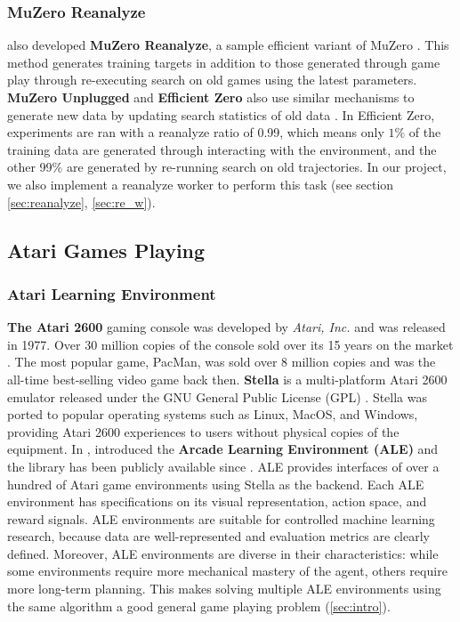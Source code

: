 \subsubsection{MuZero Reanalyze} \label{sec:muzero_reanalyze}
\citeauthor{MasteringAtariGo_Schrittwieser.Antonoglou.ea_2020} also developed \textbf{MuZero Reanalyze}, a sample efficient variant of MuZero \cite{MasteringAtariGo_Schrittwieser.Antonoglou.ea_2020}.
This method generates training targets in addition to those generated through game play through re-executing search on old games using the latest parameters.
\textbf{MuZero Unplugged} and \textbf{Efficient Zero} also use similar mechanisms to generate new data by updating search statistics of old data \cite{OnlineOfflineReinforcement_Schrittwieser.Hubert.ea_2021b,MasteringAtariGames_Ye.Liu.ea_2021}.
In Efficient Zero, experiments are ran with a reanalyze ratio of 0.99, which means only $1\%$ of the training data are generated through interacting with the environment, and the other 99\% are generated by re-running search on old trajectories.
In our project, we also implement a reanalyze worker to perform this task (see section \ref{sec:reanalyze}, \ref{sec:re_w}).

\subsection{Atari Games Playing}
\subsubsection{Atari Learning Environment} \label{sec:ale}
\textbf{The Atari 2600} gaming console was developed by \textit{Atari, Inc.} and was released in 1977.
Over 30 million copies of the console sold over its 15 years on the market \cite{Atari2600__2022}.
The most popular game, PacMan, was sold over 8 million copies and was the all-time best-selling video game back then.
\textbf{Stella} is a multi-platform Atari 2600 emulator released under the GNU General Public License (GPL) \cite{StellaMultiPlatformAtari__}.
Stella was ported to popular operating systems such as Linux, MacOS, and Windows, providing Atari 2600 experiences to users without physical copies of the equipment.
In \citeyear{ArcadeLearningEnvironment_Bellemare.Naddaf.ea_2013a}, \citeauthor{ArcadeLearningEnvironment_Bellemare.Naddaf.ea_2013a} introduced the \textbf{Arcade Learning Environment (ALE)} and the library has been publicly available since \cite{ArcadeLearningEnvironment_Bellemare.Naddaf.ea_2013a}.
ALE provides interfaces of over a hundred of Atari game environments using Stella as the backend.
Each ALE environment has specifications on its visual representation, action space, and reward signals.
ALE environments are suitable for controlled machine learning research,
because data are well-represented and evaluation metrics are clearly defined.
Moreover, ALE environments are diverse in their characteristics: while some environments require more mechanical mastery of the agent, others require more long-term planning.
This makes solving multiple ALE environments using the same algorithm a good general game playing problem (\ref{sec:intro}).

